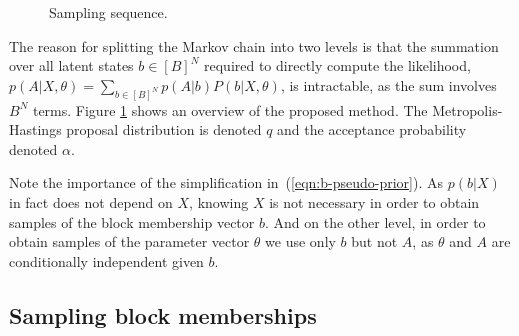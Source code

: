 \begin{figure}[!h]
	\centering

	\caption{Sampling sequence.}
	\label{fig:samp-sequence}
\end{figure}

The reason for splitting the Markov chain into two levels is that the summation over all latent states $b \in [B]^N$ required to directly compute the likelihood, $p(A| X, \theta) = \sum_{b \in [B]^N} p(A | b) P(b | X, \theta)$, is intractable, as the sum involves $B^N$ terms. 
Figure \ref{fig:samp-sequence} shows an overview of the proposed method. 
The Metropolis-Hastings proposal distribution is denoted $q$ and the acceptance probability denoted $\alpha$.

Note the importance of the simplification in~(\ref{eqn:b-pseudo-prior}). 
As $p(b| X)$ in fact does not depend on $X$, 
knowing $X$ is not necessary in order to obtain samples
of the block membership vector $b$.
And on the other level, in order to obtain 
samples of the parameter vector $\theta$
we use only $b$ but not $A$, as $\theta$ and $A$ are
conditionally independent given $b$. 

\FloatBarrier
\subsection{Sampling block memberships}

